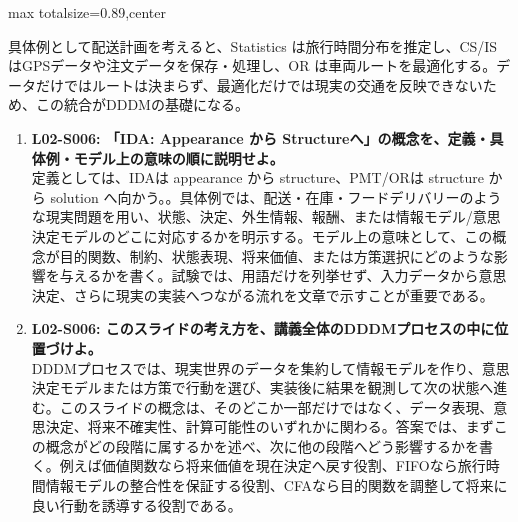 \begin{minipage}[t]{0.58\textwidth}
\begin{adjustbox}{max totalsize={\textwidth}{0.89\textheight},center}
\begin{minipage}{\textwidth}
具体例として配送計画を考えると、Statistics は旅行時間分布を推定し、CS/IS はGPSデータや注文データを保存・処理し、OR は車両ルートを最適化する。データだけではルートは決まらず、最適化だけでは現実の交通を反映できないため、この統合がDDDMの基礎になる。\par{}\begin{enumerate}\item \textbf{L02-S006: 「IDA: Appearance から Structureへ」の概念を、定義・具体例・モデル上の意味の順に説明せよ。}\\定義としては、IDAは appearance から structure、PMT/ORは structure から solution へ向かう。。具体例では、配送・在庫・フードデリバリーのような現実問題を用い、状態、決定、外生情報、報酬、または情報モデル/意思決定モデルのどこに対応するかを明示する。モデル上の意味として、この概念が目的関数、制約、状態表現、将来価値、または方策選択にどのような影響を与えるかを書く。試験では、用語だけを列挙せず、入力データから意思決定、さらに現実の実装へつながる流れを文章で示すことが重要である。\item \textbf{L02-S006: このスライドの考え方を、講義全体のDDDMプロセスの中に位置づけよ。}\\DDDMプロセスでは、現実世界のデータを集約して情報モデルを作り、意思決定モデルまたは方策で行動を選び、実装後に結果を観測して次の状態へ進む。このスライドの概念は、そのどこか一部だけではなく、データ表現、意思決定、将来不確実性、計算可能性のいずれかに関わる。答案では、まずこの概念がどの段階に属するかを述べ、次に他の段階へどう影響するかを書く。例えば価値関数なら将来価値を現在決定へ戻す役割、FIFOなら旅行時間情報モデルの整合性を保証する役割、CFAなら目的関数を調整して将来に良い行動を誘導する役割である。\end{enumerate}
\end{minipage}
\end{adjustbox}
\end{minipage}


